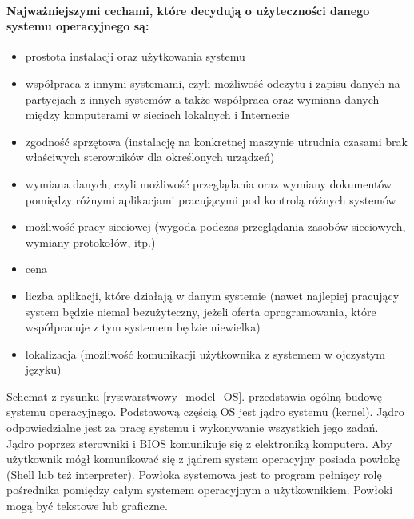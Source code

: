 \documentclass[]{report}
\begin{document}
\paragraph{Najważniejszymi cechami, które decydują o użyteczności danego systemu operacyjnego są:}
\begin{itemize}
\item prostota instalacji oraz użytkowania systemu
\item współpraca z innymi systemami, czyli możliwość odczytu i zapisu danych na partycjach z innych systemów a także współpraca oraz wymiana danych między komputerami w sieciach lokalnych i Internecie
\item zgodność sprzętowa (instalację na konkretnej maszynie utrudnia czasami brak właściwych sterowników dla określonych urządzeń)
\item wymiana danych, czyli możliwość przeglądania oraz wymiany dokumentów pomiędzy różnymi aplikacjami pracującymi pod kontrolą różnych systemów
\item możliwość pracy sieciowej (wygoda podczas przeglądania zasobów sieciowych, wymiany protokołów, itp.)
\item cena
\item liczba aplikacji, które działają w danym systemie (nawet najlepiej pracujący system będzie niemal bezużyteczny, jeżeli oferta oprogramowania, które współpracuje z tym systemem będzie niewielka)
\item lokalizacja (możliwość komunikacji użytkownika z systemem w ojczystym języku)
\end{itemize}

Schemat z rysunku \ref{rys:warstwowy_model_OS}. przedstawia ogólną budowę systemu operacyjnego. Podstawową częścią OS jest jądro systemu (kernel). Jądro odpowiedzialne jest za pracę systemu i wykonywanie wszystkich jego zadań. Jądro poprzez sterowniki i BIOS komunikuje się z elektroniką komputera. Aby użytkownik mógł komunikować się z jądrem system operacyjny posiada powłokę (Shell lub też interpreter). Powłoka systemowa jest to program pełniący rolę pośrednika pomiędzy całym systemem operacyjnym a użytkownikiem. Powłoki mogą być tekstowe lub graficzne.
\end{document}
